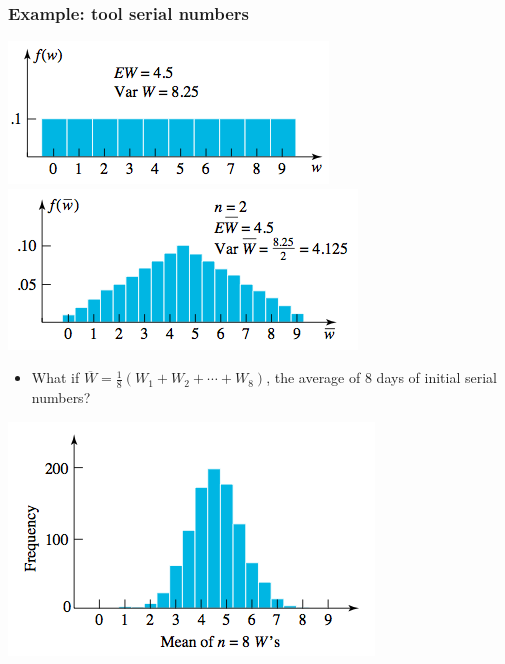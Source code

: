 \documentclass[handout]{beamer}\usepackage[]{graphicx}\usepackage[]{color}
\providecommand{\ov}[1]{\overline{#1}}
\numberwithin{equation}{section}
\begin{document}
\begin{frame}
\frametitle{Example: tool serial numbers}
 \includegraphics{../../fig/wbar1.png}
 \includegraphics{../../fig/wbar2.png}
\begin{itemize}
\item What if $\ov{W} = \frac{1}{8}(W_1 + W_2 + \cdots + W_8)$, the average of 8 days of initial serial numbers?
\end{itemize}
 \includegraphics{../../fig/wbar8.png}
\end{frame}
\end{document}
